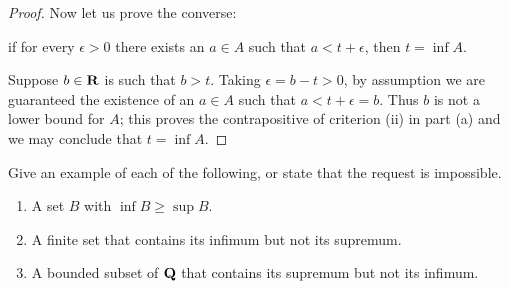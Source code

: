 \documentclass{lew98_solutions}
\begin{document}
\begin{solution}
\begin{enumerate}
\begin{proof}
            Now let us prove the converse:
            \begin{center}
                if for every \( \epsilon > 0 \) there exists an \( a \in A \) such that \( a < t + \epsilon \), then \( t = \inf A \).
            \end{center}
            Suppose \( b \in \mathbf{R} \) is such that \( b > t \). Taking \( \epsilon = b - t > 0 \), by assumption we are guaranteed the existence of an \( a \in A \) such that \( a < t + \epsilon = b \). Thus \( b \) is not a lower bound for \( A \); this proves the contrapositive of criterion (ii) in part (a) and we may conclude that \( t = \inf A \).
        \end{proof}
    \end{enumerate}
\end{solution}

\begin{exercise}
\label{ex:1.3.2}
    Give an example of each of the following, or state that the request is impossible.
    \begin{enumerate}
        \item A set \( B \) with \( \inf B \geq \sup B \).

        \item A finite set that contains its infimum but not its supremum.

        \item A bounded subset of \( \mathbf{Q} \) that contains its supremum but not its infimum.
    \end{enumerate}
\end{exercise}
\end{document}
